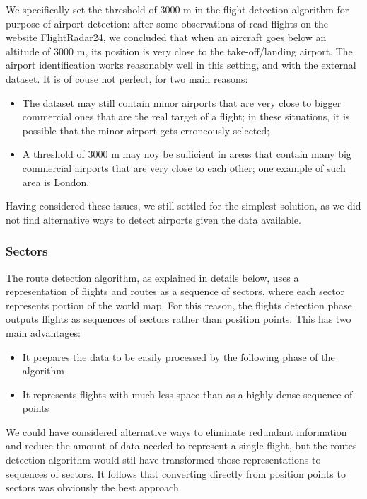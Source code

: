 \documentclass{vldb}
\begin{document}
We specifically set the threshold of 3000 m in the flight detection algorithm
for purpose of airport detection: after some observations of read flights on the
website FlightRadar24, we concluded that when an aircraft goes below an altitude
of 3000 m, its position is very close to the take-off/landing airport. The
airport identification works reasonably well in this setting, and with the
external dataset. It is of couse not perfect, for two main reasons:

\begin{itemize}
  \item The dataset may still contain minor airports that are very close to
  bigger commercial ones that are the real target of a flight; in these
  situations, it is possible that the minor airport gets erroneously selected;
  \item A threshold of 3000 m may noy be sufficient in areas that contain many
  big commercial airports that are very close to each other; one example of such
  area is London.
\end{itemize}

Having considered these issues, we still settled for the simplest solution, as
we did not find alternative ways to detect airports given the data available.

\subsubsection{Sectors}

The route detection algorithm, as explained in details below, uses a
representation of flights and routes as a sequence of sectors, where each sector
represents portion of the world map. For this reason, the flights detection
phase outputs flights as sequences of sectors rather than position points. This
has two main advantages:

\begin{itemize}
  \item It prepares the data to be easily processed by the following phase of
  the algorithm
  \item It represents flights with much less space than as a highly-dense
  sequence of points
\end{itemize}

We could have considered alternative ways to eliminate redundant information and
reduce the amount of data needed to represent a single flight, but the routes
detection algorithm would stil have transformed those representations to
sequences of sectors. It follows that converting directly from position points
to sectors was obviously the best approach.
\end{document}
